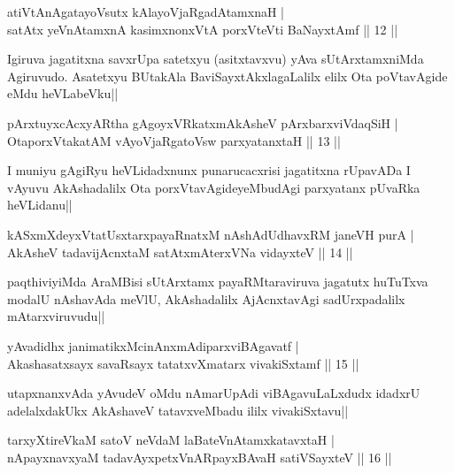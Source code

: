 
\begin{shl}
atiVtAnAgatayoVsutx kAlayoVjaRgadAtamxnaH |\\
satAtx yeVnA\s \s tamxnA kasimxnonxVtA porxVteVti BaNayxtAmf \hfill || 12 ||
\end{shl}

\begin{artha}
Igiruva jagatitxna savxrUpa satetxyu (asitxtavxvu) yAva sUtArxtamxniMda Agiruvudo. Asatetxyu BUtakAla BaviSayxtAkxlagaLalilx elilx Ota poVtavAgide eMdu heVLabeVku||
\end{artha}

\begin{shl}
pArxtuyxcAcxyARtha gAgoyxVRkatxmAkAsheV pArxbarxviVdaqSiH |\\
OtaporxVtakatAM vAyoVjaRgatoV\s sw parxyatanxtaH \hfill || 13 ||
\end{shl}

\begin{artha}
I muniyu gAgiRyu heVLidadxnunx punarucacxrisi jagatitxna rUpavADa I vAyuvu AkAshadalilx Ota porxVtavAgideyeMbudAgi parxyatanx pUvaRka heVLidanu||
\end{artha}%

\begin{shl}
kASxmXdeyxVtatUsxtarxpayaRnatxM nAshAdUdhavxRM janeVH purA |\\
AkAsheV tadavijAcnxtaM satAtxmAterxVNa vidayxteV \hfill || 14 ||
\end{shl}

\begin{artha}
paqthiviyiMda AraMBisi sUtArxtamx payaRMtaraviruva jagatutx huTuTxva modalU nAshavAda meVlU, AkAshadalilx AjAcnxtavAgi sadUrxpadalilx mAtarxviruvudu||
\end{artha}

\begin{shl}
yAvadidhx janimatikxMcinAnxmAdiparxviBAgavatf |\\
Akashasatxsayx savaRsayx tatatxvXmatarx vivakiSxtamf \hfill || 15 ||
\end{shl}

\begin{artha}
utapxnanxvAda yAvudeV oMdu nAmarUpAdi viBAgavuLaLxdudx idadxrU adelalxdakUkx AkAshaveV tatavxveMbadu ililx vivakiSxtavu||
\end{artha}

\begin{shl}
tarxyXtireVkaM satoV neVdaM laBateV\s nAtamxkatavxtaH |\\
nApayxnavxyaM tadavAyxpetxVnARpayxBAvaH satiVSayxteV \hfill || 16 ||
\end{shl}

